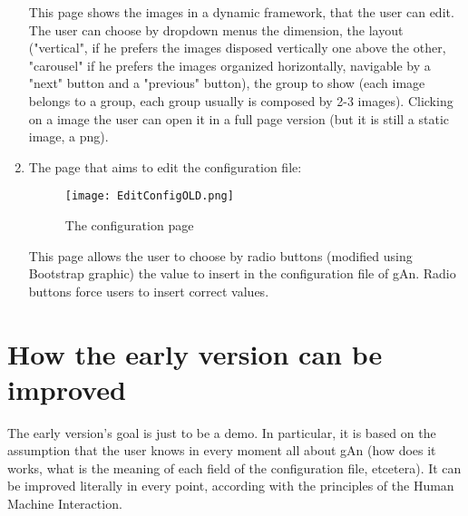 \begin{enumerate}
This page shows the images in a dynamic framework, that the user can edit.
The user can choose by dropdown menus the dimension, the layout ("vertical", if he prefers the images disposed vertically one above the other, "carousel" if he prefers the images organized horizontally, navigable by a "next" button and a "previous" button), the group to show (each image belongs to a group, each group usually is composed by 2-3 images). Clicking on a image the user can open it in a full page version (but it is still a static image, a png).


\item The page that aims to edit the configuration file:

\begin{figure}[H]
\centering
\texttt{[image: EditConfigOLD.png]}  
\caption{The configuration page}
\end{figure}   

This page allows the user to choose by radio buttons (modified using Bootstrap graphic) the value to insert in the configuration file of gAn. Radio buttons force users to insert correct values.    

\end{enumerate}

\section{How the early version can be improved}
The early version's goal is just to be a demo. In particular, it is based on the assumption that the user knows in every moment all about gAn (how does it works,  what is the meaning of each field of the configuration file, etcetera). It can be improved literally in every point, according with the principles of the Human Machine Interaction.

